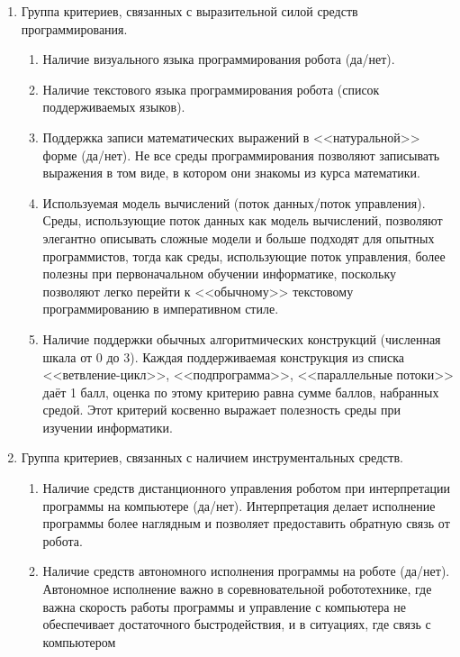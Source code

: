 \documentclass[a5paper]{article}
\begin{document}
\begin{enumerate}
    \item Группа критериев, связанных с выразительной силой средств программирования.
    \begin{enumerate}
        \item Наличие визуального языка программирования робота (да/нет).
        \item Наличие текстового языка программирования робота (список поддерживаемых языков).
        \item Поддержка записи математических выражений в <<натуральной>> форме (да/нет). Не все среды 
                программирования позволяют записывать выражения в том виде, в котором они знакомы из курса математики.
        \item Используемая модель вычислений (поток данных/поток управления). Среды, использующие поток 
                данных как модель вычислений, позволяют элегантно описывать сложные модели и больше подходят 
                для опытных программистов, тогда как среды, использующие поток управления, более полезны при 
                первоначальном обучении информатике, поскольку позволяют легко перейти к <<обычному>> текстовому 
                программированию в императивном стиле.
        \item Наличие поддержки обычных алгоритмических конструкций (численная шкала от 0 до 3). Каждая 
                поддерживаемая конструкция из списка <<ветвление-цикл>>, <<подпрограмма>>, <<параллельные потоки>> 
                даёт 1 балл, оценка по этому критерию равна сумме баллов, набранных средой. Этот критерий 
                косвенно выражает полезность среды при изучении информатики.
    \end{enumerate}
    \item Группа критериев, связанных с наличием инструментальных средств.
    \begin{enumerate}
        \item Наличие средств дистанционного управления роботом при интерпретации программы на компьютере (да/нет). 
                Интерпретация делает исполнение программы более наглядным и позволяет предоставить обратную 
                связь от робота.
        \item Наличие средств автономного исполнения программы на роботе (да/нет). Автономное исполнение 
                важно в соревновательной робототехнике, где важна скорость работы программы и управление с 
                компьютера не обеспечивает достаточного быстродействия, и в ситуациях, где связь с компьютером 

\end{enumerate}
\end{enumerate}
\end{document}
